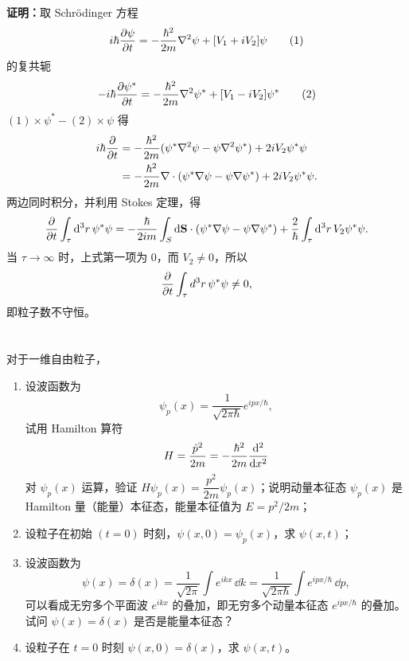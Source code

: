 \documentclass[10pt,a4paper]{article}
\begin{document}
\vspace{0.5cm}

\noindent\textbf{证明：}取 Schr\"odinger 方程
\[
 i\hbar \pdv{\psi}{t} = -\frac{\hbar^2}{2m}\nabla^2\psi + [V_1+iV_2]\psi \tag{1}
\]
的复共轭
\[
 -i\hbar \pdv{\psi^*}{t} = -\frac{\hbar^2}{2m}\nabla^2\psi^* + [V_1-iV_2]\psi^* \tag{2}
\]
$(1)\times \psi^* - (2)\times \psi$ 得
\begin{align*}
   i\hbar \pdv{}{t}(\psi^*\psi)
   &= -\frac{\hbar^2}{2m}(\psi^*\nabla^2\psi - \psi\nabla^2\psi^*) + 2iV_2\psi^*\psi\\
   &= -\frac{\hbar^2}{2m}\nabla\cdot(\psi^*\nabla\psi - \psi\nabla\psi^*) + 2iV_2\psi^*\psi.
\end{align*}
两边同时积分，并利用 Stokes 定理，得
\[
 \pdv{}{t}\int_\tau \dd^3r\, \psi^*\psi
 = -\frac{\hbar}{2im}\int_S \dd\vb{S}\cdot(\psi^*\nabla\psi - \psi\nabla\psi^*)
 + \frac{2}{\hbar}\int_\tau \dd^3r\, V_2\psi^*\psi.
\]
当 $\tau\to\infty$ 时，上式第一项为 $0$，而 $V_2\neq 0$，所以
\[
 \pdv{}{t}\int_\tau d^3r\, \psi^*\psi \neq 0,
\]
即粒子数不守恒。

\section{}
对于一维自由粒子，

\begin{enumerate}[label=(\alph*)]
    \item 设波函数为
    \[
    \psi_p(x)=\frac{1}{\sqrt{2\pi\hbar}}e^{ipx/\hbar},
    \]
    试用 Hamilton 算符
    \[
    H = \frac{\hat p^2}{2m} = -\frac{\hbar^2}{2m}\dv[2]{}{x}
    \]
    对 $\psi_p(x)$ 运算，验证 $H\psi_p(x)=\dfrac{p^2}{2m}\psi_p(x)$；说明动量本征态 $\psi_p(x)$ 是 Hamilton 量（能量）本征态，能量本征值为 $E=p^2/2m$；

    \item 设粒子在初始 $(t=0)$ 时刻，$\psi(x,0)=\psi_{p}(x)$，求 $\psi(x,t)$；

    \item 设波函数为
    \[
    \psi(x)=\delta(x)=\frac{1}{\sqrt{2\pi}}\int e^{ikx}\, \dd k
    = \frac{1}{\sqrt{2\pi\hbar}}\int e^{ipx/\hbar}\, \dd p,
    \]
    可以看成无穷多个平面波 $e^{ikx}$ 的叠加，即无穷多个动量本征态 $e^{ipx/\hbar}$ 的叠加。试问 $\psi(x)=\delta(x)$ 是否是能量本征态？

    \item 设粒子在 $t=0$ 时刻 $\psi(x,0)=\delta(x)$，求 $\psi(x,t)$。
\end{enumerate}

\vspace{0.5cm}
\end{document}
